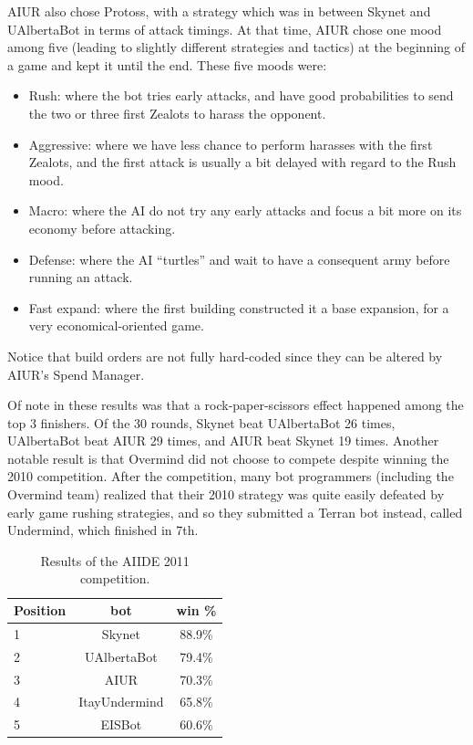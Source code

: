 \documentclass[journal]{IEEEtran}
\begin{document}
AIUR also chose  Protoss, with a strategy which  was in between Skynet
and UAlbertaBot in terms of  attack timings.  At that time, AIUR chose
one  mood among  five (leading  to slightly  different  strategies and
tactics) at the  beginning of a game and kept it  until the end. These
five moods were:
\begin{itemize}
\item  Rush:  where  the  bot  tries  early  attacks,  and  have  good
  probabilities to send  the two or three first  Zealots to harass the
  opponent.
\item Aggressive: where  we have less chance to  perform harasses with
  the first  Zealots, and  the first attack  is usually a  bit delayed
  with regard to the Rush mood.
\item Macro: where the AI do not try any early attacks and focus a bit
  more on its economy before attacking.
\item Defense: where the AI  ``turtles'' and wait to have a consequent
  army before running an attack.
\item  Fast expand:  where the  first building  constructed it  a base
  expansion, for a very economical-oriented game.
\end{itemize}
Notice that  build orders are not  fully hard-coded since  they can be
altered by AIUR's Spend Manager.

Of  note  in  these  results  was that  a  rock-paper-scissors  effect
happened among  the top  3 finishers.  Of  the 30 rounds,  Skynet beat
UAlbertaBot 26  times, UAlbertaBot beat  AIUR 29 times, and  AIUR beat
Skynet  19 times.   Another notable  result is  that Overmind  did not
choose  to compete despite  winning the  2010 competition.   After the
competition,  many  bot  programmers  (including  the  Overmind  team)
realized that their  2010 strategy was quite easily  defeated by early
game rushing strategies,  and so they submitted a  Terran bot instead,
called Undermind, which finished in 7th.

\begin{table}[t!]
\caption{Results of the AIIDE 2011 competition.}
\label{tab:aiide2011}
\begin{small}
\begin{center}
\begin{tabular}{|l|c|c|}
\hline
Position & bot & win \% \\ \hline
1 & Skynet & 88.9\% \\
2 & UAlbertaBot & 79.4\% \\
3 & AIUR & 70.3\% \\
4 & ItayUndermind & 65.8\% \\
5 & EISBot & 60.6\% \\ \hline
\end{tabular}
\end{center}
\end{small}
\end{table}
\end{document}

